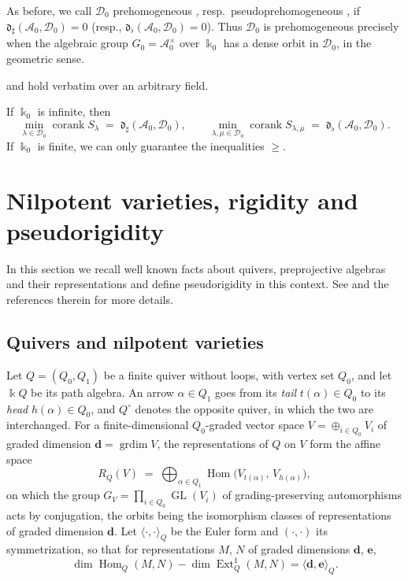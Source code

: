 \documentclass[12pt]{article}
\def\xspace{ }%
\theoremstyle{definition}
\newcommand{\prigity}{pseudorigidity\xspace}
\newcommand{\pvs}{prehomogeneous\xspace}
\newcommand{\wpvs}{pseudo\pvs}
\newcommand{\bd}{\boldsymbol{d}}  %
\newcommand{\be}{\boldsymbol{e}}
\newcommand{\GL}{\operatorname{GL}}
\newcommand{\Ext}{\operatorname{Ext}}
\newcommand{\Hom}{\operatorname{Hom}}
\newcommand{\grdim}{\operatorname{grdim}}
\newcommand{\kk}{\Bbbk}
\newcommand{\alg}{\mathcal{A}}   %
\newcommand{\bmdl}{\mathcal{D}}   %
\newcommand{\qvert}{Q_0}    %
\newcommand{\qarr}{Q_1}     %
\newcommand{\dfr}{\mathfrak{d}}  %
\newcommand{\Sop}{S}
\newcommand{\rsub}{\sharp}       %
\newcommand{\psub}{\flat}        %
\newcommand{\cork}{\operatorname{corank}}
\begin{document}
As before, we call $\bmdl_0$ \pvs, resp.\ \wpvs, if $\dfr_\rsub(\alg_0,\bmdl_0)=0$ (resp., $\dfr_\psub(\alg_0,\bmdl_0)=0$).
Thus $\bmdl_0$ is \pvs precisely when the algebraic group $G_0 = \alg_0^\times$ over $\kk_0$ has a dense orbit in
$\bmdl_0$, in the geometric sense.




 and  hold verbatim over an arbitrary field.


If $\kk_0$ is infinite, then
\[
   \min_{\lambda\in\bmdl_0}\cork \Sop_\lambda \;=\; \dfr_\rsub(\alg_0,\bmdl_0),
   \qquad
   \min_{\lambda,\mu\in\bmdl_0}\cork \Sop_{\lambda,\mu} \;=\; \dfr_\psub(\alg_0,\bmdl_0).
\]
If $\kk_0$ is finite, we can only guarantee the inequalities $\ge$.


\section{Nilpotent varieties, rigidity and \prigity}\label{sec:nilp}

In this section we recall well known facts about quivers, preprojective algebras and their representations
and define \prigity in this context. See \cite{MR4847234} and the references therein for more details.

\subsection{Quivers and nilpotent varieties}\label{ssec:quivers}

Let $Q = (\qvert,\qarr)$ be a finite quiver without loops, with vertex set
$\qvert$, and let $\kk Q$ be its path
algebra. An arrow $\alpha \in \qarr$ goes from its \emph{tail}
$t(\alpha) \in \qvert$ to its \emph{head} $h(\alpha) \in \qvert$, and $Q^\circ$
denotes the opposite quiver, in which the two are interchanged. For a
finite-dimensional $\qvert$-graded vector space $V = \oplus_{i\in \qvert}V_i$ of
graded dimension $\bd = \grdim V$, the representations of $Q$ on $V$ form
the affine space
\[
   R_Q(V) \;=\; \bigoplus_{\alpha\in\qarr}
   \Hom\bigl(V_{t(\alpha)},\,V_{h(\alpha)}\bigr) ,
\]
on which the group
$G_V = \prod_{i\in \qvert}\GL(V_i)$ of grading-preserving automorphisms acts by
conjugation, the orbits being the isomorphism classes of representations of
graded dimension $\bd$. Let $\langle\cdot,\cdot\rangle_Q$ be the
Euler form and $(\cdot,\cdot)$ its symmetrization, so that for representations
$M$, $N$ of graded dimensions $\bd$, $\be$,
\[
   \dim\Hom_Q(M,N) - \dim\Ext^1_Q(M,N) =
   \langle\bd,\be\rangle_Q .
\]
\end{document}
